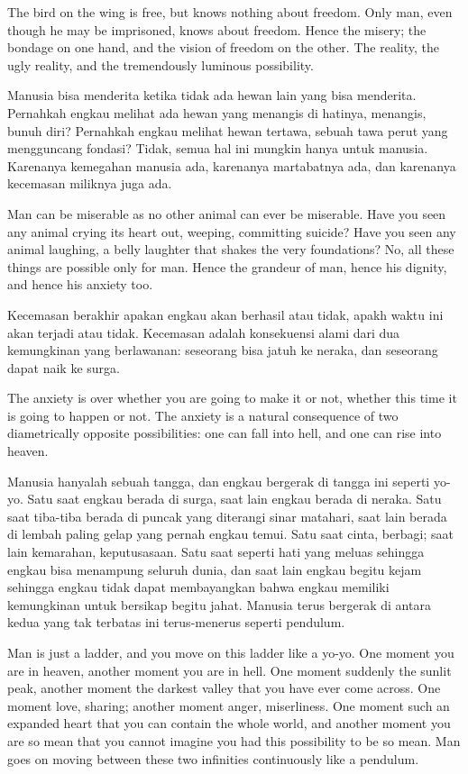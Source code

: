 \english
The bird on the wing is free, but knows nothing about freedom. Only man, even though he may be imprisoned, knows about freedom. Hence the misery; the bondage on one hand, and the vision of freedom on the other. The reality, the ugly reality, and the tremendously luminous possibility.

\bahasa
Manusia bisa menderita ketika tidak ada hewan lain yang bisa menderita. Pernahkah engkau melihat ada hewan yang menangis di hatinya, menangis, bunuh diri? Pernahkah engkau melihat hewan tertawa, sebuah tawa perut yang mengguncang fondasi? Tidak, semua hal ini mungkin hanya untuk manusia. Karenanya kemegahan manusia ada, karenanya martabatnya ada, dan karenanya kecemasan miliknya juga ada.

\english
Man can be miserable as no other animal can ever be miserable. Have you seen any animal crying its heart out, weeping, committing suicide? Have you seen any animal laughing, a belly laughter that shakes the very foundations? No, all these things are possible only for man. Hence the grandeur of man, hence his dignity, and hence his anxiety too.

\bahasa
Kecemasan berakhir apakan engkau akan berhasil atau tidak, apakh waktu ini akan terjadi atau tidak. Kecemasan adalah konsekuensi alami dari dua kemungkinan yang berlawanan: seseorang bisa jatuh ke neraka, dan seseorang dapat naik ke surga.

\english
The anxiety is over whether you are going to make it or not, whether this time it is going to happen or not. The anxiety is a natural consequence of two diametrically opposite possibilities: one can fall into hell, and one can rise into heaven.

\bahasa
Manusia hanyalah sebuah tangga, dan engkau bergerak di tangga ini seperti yo-yo. Satu saat engkau berada di surga, saat lain engkau berada di neraka. Satu saat tiba-tiba berada di puncak yang diterangi sinar matahari, saat lain berada di lembah paling gelap yang pernah engkau temui. Satu saat cinta, berbagi; saat lain kemarahan, keputusasaan. Satu saat seperti hati yang meluas sehingga engkau bisa menampung seluruh dunia, dan saat lain engkau begitu kejam sehingga engkau tidak dapat membayangkan bahwa engkau memiliki kemungkinan untuk bersikap begitu jahat. Manusia terus bergerak di antara kedua yang tak terbatas ini terus-menerus seperti pendulum.

\english
Man is just a ladder, and you move on this ladder like a yo-yo. One moment you are in heaven, another moment you are in hell. One moment suddenly the sunlit peak, another moment the darkest valley that you have ever come across. One moment love, sharing; another moment anger, miserliness. One moment such an expanded heart that you can contain the whole world, and another moment you are so mean that you cannot imagine you had this possibility to be so mean. Man goes on moving between these two infinities continuously like a pendulum.


